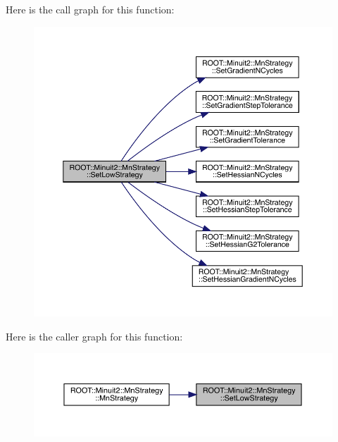 Here is the call graph for this function\+:\nopagebreak
\begin{figure}[H]
\begin{center}
\leavevmode
\includegraphics[width=350pt]{da/de4/classROOT_1_1Minuit2_1_1MnStrategy_a24671e2ae8a1224583adfcb3fb73ad55_cgraph}
\end{center}
\end{figure}
Here is the caller graph for this function\+:\nopagebreak
\begin{figure}[H]
\begin{center}
\leavevmode
\includegraphics[width=350pt]{da/de4/classROOT_1_1Minuit2_1_1MnStrategy_a24671e2ae8a1224583adfcb3fb73ad55_icgraph}
\end{center}
\end{figure}
\mbox{\label{classROOT_1_1Minuit2_1_1MnStrategy_ae813d1aedcf6fa8f2bfb09a501a783f4}} 
